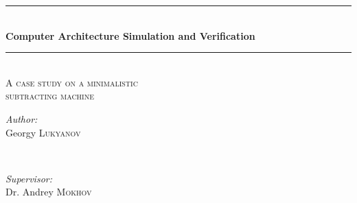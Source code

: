 \begin{titlepage}

\newcommand{\HRule}{\rule{\linewidth}{0.5mm}} %

\center %




\HRule \\[0.4cm]
{ \huge \bfseries Computer Architecture Simulation and Verification}\\[0.4cm] %
\HRule \\[1.5cm]

\textsc{\Large A case study on a minimalistic\\ subtracting machine}\\[0.5cm] %


\begin{minipage}{0.4\textwidth}
\begin{flushleft} \large
\emph{Author:}\\
Georgy \textsc{Lukyanov} %
\end{flushleft}
\end{minipage}
~
\begin{minipage}{0.4\textwidth}
\begin{flushright} \large
\emph{Supervisor:} \\
Dr. Andrey \textsc{Mokhov} %
\end{flushright}
\end{minipage}\\[2cm]


\end{titlepage}
